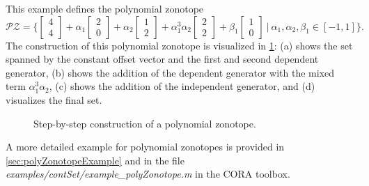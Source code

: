 This example defines the polynomial zonotope
\begin{equation*}
	\mathcal{PZ} = \bigg \{ \begin{bmatrix} 4 \\ 4 \end{bmatrix} + \alpha_1 \begin{bmatrix} 2 \\ 0 \end{bmatrix} + \alpha_2 \begin{bmatrix} 1 \\ 2 \end{bmatrix} + \alpha_1^3 \alpha_2 \begin{bmatrix} 2 \\ 2 \end{bmatrix} + \beta_1\begin{bmatrix} 1 \\ 0 \end{bmatrix}~\bigg|~ \alpha_1,\alpha_2,\beta_1 \in [-1,1] \bigg \}.
\end{equation*}
The construction of this polynomial zonotope is visualized in \cref{fig:polyZonotope}: (a) shows the set spanned by the constant offset vector and the first and second dependent generator, (b) shows the addition of the dependent generator with the mixed term $\alpha_1^3 \alpha_2$, (c) shows the addition of the independent generator, and (d) visualizes the final set.

\begin{figure}[htb]	
	\begin{center}
	\caption{Step-by-step construction of a polynomial zonotope.}
	\label{fig:polyZonotope}
	\end{center}
\end{figure}

A more detailed example for polynomial zonotopes is provided in \cref{sec:polyZonotopeExample} and in the file \textit{examples/contSet/example\_polyZonotope.m} in the CORA toolbox.